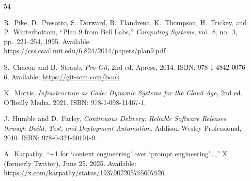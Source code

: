 \documentclass[acmlarge,nonacm,screen]{acmart}
\begin{document}
\begin{thebibliography}{54}

R.~Pike, D.~Presotto, S.~Dorward, B.~Flandrena, K.~Thompson, H.~Trickey, and P.~Winterbottom,
``Plan 9 from Bell Labs,''
\textit{Computing Systems}, vol.~8, no.~3, pp.~221--254, 1995.
\newline Available: \url{https://css.csail.mit.edu/6.824/2014/papers/plan9.pdf}

S.~Chacon and B.~Straub,
\textit{Pro Git}, 2nd ed.
Apress, 2014. ISBN: 978-1-4842-0076-6.
\newline Available: \url{https://git-scm.com/book}


K.~Morris,
\textit{Infrastructure as Code: Dynamic Systems for the Cloud Age}, 2nd ed.
O'Reilly Media, 2021. ISBN: 978-1-098-11467-1.

J.~Humble and D.~Farley,
\textit{Continuous Delivery: Reliable Software Releases through Build, Test, and Deployment Automation}.
Addison-Wesley Professional, 2010. ISBN: 978-0-321-60191-9.




A.~Karpathy,
``+1 for `context engineering' over `prompt engineering'\ldots,''
X (formerly Twitter), June 25, 2025.
\newline Available: \url{https://x.com/karpathy/status/1937902205765607626}


\end{thebibliography}
\end{document}
